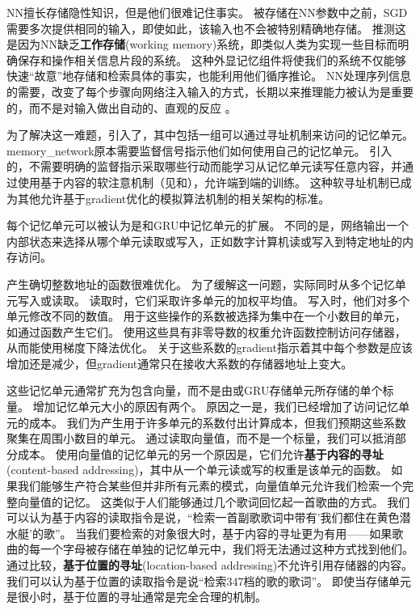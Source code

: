 \gls{NN}擅长存储隐性知识，但是他们很难记住事实。
被存储在\gls{NN}参数中之前，\gls{SGD}需要多次提供相同的输入，即使如此，该输入也不会被特别精确地存储。
\citep{Graves-et-al-arxiv2014}推测这是因为\gls{NN}缺乏\textbf{工作存储}(working memory)系统，即类似人类为实现一些目标而明确保存和操作相关信息片段的系统。
这种外显记忆组件将使我们的系统不仅能够快速``故意''地存储和检索具体的事实，也能利用他们循序推论。
\gls{NN}处理序列信息的需要，改变了每个步骤向网络注入输入的方式，长期以来推理能力被认为是重要的，而不是对输入做出自动的、直观的反应\citep{hinton1990mapping} 。


为了解决这一难题，\citep{Weston2014}引入了，其中包括一组可以通过寻址机制来访问的记忆单元。
\gls{memory_network}原本需要监督信号指示他们如何使用自己的记忆单元。
\citep{Graves-et-al-arxiv2014}引入的，不需要明确的监督指示采取哪些行动而能学习从记忆单元读写任意内容，并通过使用基于内容的软注意机制（见\citep{Bahdanau-et-al-ICLR2015-small}和），允许端到端的训练。
这种软寻址机制已成为其他允许基于\gls{gradient}优化的模拟算法机制的相关架构的标准\citep{Sukhbaatar2015,Joulin+Mikolov-2015,Kumar-et-al-2015,Vinyals2015,Grefenstette-et-al-NIPS2015}。

每个记忆单元可以被认为是和GRU中记忆单元的扩展。
不同的是，网络输出一个内部状态来选择从哪个单元读取或写入，正如数字计算机读或写入到特定地址的内存访问。


产生确切整数地址的函数很难优化。
为了缓解这一问题，实际同时从多个记忆单元写入或读取。
读取时，它们采取许多单元的加权平均值。
写入时，他们对多个单元修改不同的数值。
用于这些操作的系数被选择为集中在一个小数目的单元，如通过函数产生它们。
使用这些具有非零导数的权重允许函数控制访问存储器，从而能使用梯度下降法优化。
关于这些系数的\gls{gradient}指示着其中每个参数是应该增加还是减少，但\gls{gradient}通常只在接收大系数的存储器地址上变大。

这些记忆单元通常扩充为包含向量，而不是由或GRU存储单元所存储的单个标量。
增加记忆单元大小的原因有两个。
原因之一是，我们已经增加了访问记忆单元的成本。
我们为产生用于许多单元的系数付出计算成本，但我们预期这些系数聚集在周围小数目的单元。
通过读取向量值，而不是一个标量，我们可以抵消部分成本。 
使用向量值的记忆单元的另一个原因是，它们允许\textbf{基于内容的寻址}(content-based addressing)，其中从一个单元读或写的权重是该单元的函数。
如果我们能够生产符合某些但并非所有元素的模式，向量值单元允许我们检索一个完整向量值的记忆。
这类似于人们能够通过几个歌词回忆起一首歌曲的方式。
我们可以认为基于内容的读取指令是说，``检索一首副歌歌词中带有'我们都住在黄色潜水艇'的歌''。
当我们要检索的对象很大时，基于内容的寻址更为有用——如果歌曲的每一个字母被存储在单独的记忆单元中，我们将无法通过这种方式找到他们。
通过比较，\textbf{基于位置的寻址}(location-based addressing)不允许引用存储器的内容。
我们可以认为基于位置的读取指令是说``检索347档的歌的歌词''。
即使当存储单元是很小时，基于位置的寻址通常是完全合理的机制。

